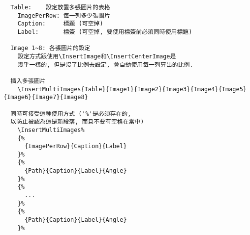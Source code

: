   \begin{framed}
  \begin{verbatim}
  Table:    設定放置多張圖片的表格
    ImagePerRow: 每一列多少張圖片
    Caption:     標題 (可空掉)
    Label:       標簽 (可空掉, 要使用標簽前必須同時使用標題)

  Image 1~8: 各張圖片的設定
    設定方式跟使用\InsertImage和\InsertCenterImage是
    幾乎一樣的, 但是沒了比例去設定, 會自動使用每一列算出的比例.

  插入多張圖片
    \InsertMultiImages{Table}{Image1}{Image2}{Image3}{Image4}{Image5}{Image6}{Image7}{Image8}

  同時可接受這種使用方式 ('%'是必須存在的,
  以防止被認為這是新段落, 而且不要有空格在當中)
    \InsertMultiImages%
    {%
      {ImagePerRow}{Caption}{Label}
    }%
    {%
      {Path}{Caption}{Label}{Angle}
    }%
    {%
      ...
    }%
    {%
      {Path}{Caption}{Label}{Angle}
    }%
  \end{verbatim}
  \end{framed}

  \newpage

